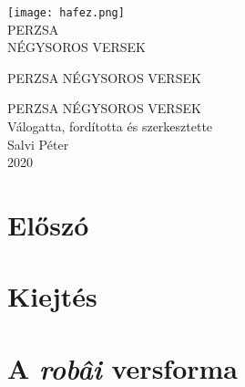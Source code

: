 

\frontmatter
{}

\begin{titlepage}
\centering
\texttt{[image: hafez.png]}\\
\vspace{\fill}
\Large PERZSA\\NÉGYSOROS VERSEK
\end{titlepage}

\thispagestyle{empty}
\newpage

\begin{titlepage}
\thispagestyle{plain}
\centering
\vspace*{2cm}
{\large PERZSA NÉGYSOROS VERSEK}
\end{titlepage}

\thispagestyle{empty}
\newpage

\begin{titlepage}
\thispagestyle{plain}
\centering
\vspace*{2cm}
{\Large PERZSA NÉGYSOROS VERSEK}\\
\vspace{7cm}
{\large Válogatta, fordította és szerkesztette}\\
\vspace{1em}
{\large Salvi Péter}\\
\vspace{1em}
2020
\end{titlepage}






\thispagestyle{empty}
\newpage

\chapter*{Előszó}


\chapter*{Kiejtés}


\chapter*{A \emph{robâi} versforma}


